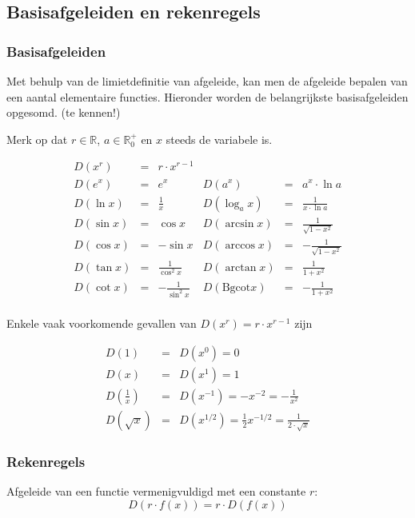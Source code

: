 \subsection{Basisafgeleiden en rekenregels}
\subsubsection{Basisafgeleiden}

Met behulp van de limietdefinitie van afgeleide, kan men de afgeleide bepalen van een aantal elementaire functies. Hieronder worden de belangrijkste basisafgeleiden opgesomd. (te kennen!)

Merk op dat $r \in \mathbb{R}$, $a \in \mathbb{R}^+_0$ en $x$ steeds de variabele is.

\begin{equation*}
\begin{array}{rclrcl}
D(x^r)&=&r\cdot x^{r-1} & & &  \\
D(e^x)&=&e^x& D(a^x)&=&a^x\cdot \ln a \\
D(\ln x)&=&\frac{1}{x}&D(\log_{a}x)&=&\frac{1}{x\cdot \ln a} \\
D(\sin x)&=&\cos x  & D(\arcsin x) &=& \frac{1}{\sqrt{1-x^2}} \\
D(\cos x)&=&-\sin x  & D(\arccos x) &=& -\frac{1}{\sqrt{1-x^2}} \\
D(\tan x)&=&\frac{1}{\cos^2 x} & D(\arctan x) &=& \frac{1}{1+x^2} \\
D(\cot x)&=&-\frac{1}{\sin^2 x} & D(\text{Bgcot} x) &=& -\frac{1}{1+x^2} \\
\end{array}
\end{equation*}

Enkele vaak voorkomende gevallen van $D(x^r)=r\cdot x^{r-1}$ zijn

\begin{eqnarray*}
D(1) &=& D(x^0) = 0 \\
D(x) &=& D(x^1) = 1 \\
D(\frac{1}{x})&=&D(x^{-1})=-x^{-2}=-\frac{1}{x^2}\\
D(\sqrt{x})&=&D(x^{1/2})=\frac{1}{2}x^{-1/2}=\frac{1}{2 \cdot \sqrt{x}}
\end{eqnarray*}

\subsubsection{Rekenregels}

\begin{ftrekenregel}
	Afgeleide van een functie vermenigvuldigd met een constante $r$:
	\begin{equation*}
	D(r \cdot f(x)) = r \cdot D(f(x))
	\end{equation*}
\end{ftrekenregel}

